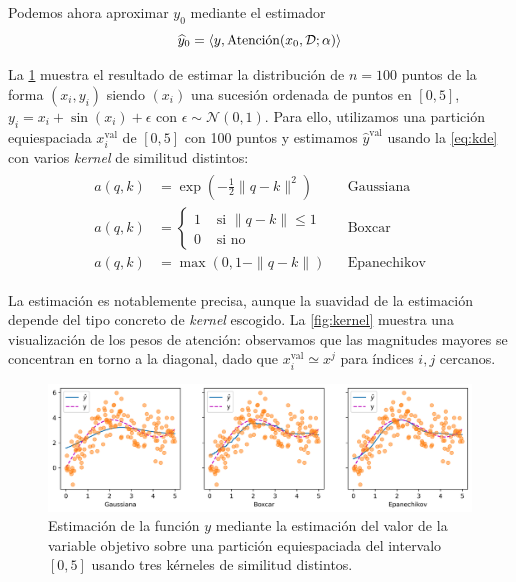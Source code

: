 Podemos ahora aproximar \( y_{0} \) mediante el estimador 
\begin{equation}\label{eq:kde}
    \widehat{y}_{0} = \left\langle y, \operatorname{Atenci\acute{o}n}(x_{0}, \mathcal{D}; \alpha) \right\rangle
\end{equation}

La \cref{fig:regression} muestra el resultado de estimar la distribución de \( n = 100 \) puntos de la forma \( (x_{i}, y_{i}) \) siendo \( (x_{i}) \) una sucesión ordenada de puntos en \( [0, 5] \), \( y_{i} = x_{i} + \sin(x_{i}) + \epsilon \) con \( \epsilon \sim \mathcal{N}(0, 1) \). Para ello, utilizamos una partición equiespaciada \( x^\text{val}_{i} \) de \( [0, 5] \) con 100 puntos y estimamos \( \widehat{y}^\text{val} \) usando la \cref{eq:kde} con varios \textit{kernel} de similitud distintos:
\[
    \begin{split}\begin{aligned}
    a(q, k) & = \exp\left(-\frac{1}{2} \|q - k\|^2 \right) && \mathrm{Gaussiana} \\
    a(q, k) & = \begin{cases}
        1 &\text{ si } \|q - k\| \leq 1 \\
        0 &\text{ si no}
    \end{cases} && \mathrm{Boxcar}
    \\
    a(q, k) & = \max\left(0, 1 - \|q - k\|\right) && \mathrm{Epanechikov}
    \end{aligned}\end{split}
\]

La estimación es notablemente precisa, aunque la suavidad de la estimación depende del tipo concreto de \textit{kernel} escogido. La \cref{fig:kernel} muestra una visualización de los pesos de atención: observamos que las magnitudes mayores se concentran en torno a la diagonal, dado que \( x^\text{val}_{i} \simeq x^j \) para índices \( i, j \) cercanos. 

\begin{figure}[tb]
    \centering
    \includegraphics[width=\textwidth]{figures/chapter4/regression.png}
    \caption{Estimación de la función \( y \) mediante la estimación del valor de la variable objetivo sobre una partición equiespaciada del intervalo \( [0, 5] \) usando tres kérneles de similitud distintos.}
    \label{fig:regression}
\end{figure}

